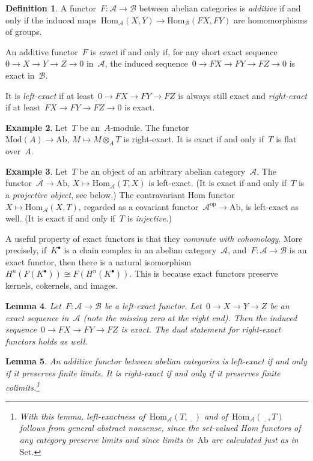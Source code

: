 \documentclass{amsart}
\theoremstyle{definition}
\newtheorem{defn}{Definition}[section]
\newtheorem{ex}[defn]{Example}
\theoremstyle{plain}
\newtheorem{lemma}[defn]{Lemma}
\theoremstyle{remark}
\newcommand{\A}{\mathcal{A}}
\newcommand{\B}{\mathcal{B}}
\newcommand{\Hom}{\mathrm{Hom}}
\newcommand{\placeholder}{\underline{\ \ \ }}
\newcommand{\Set}{\mathrm{Set}}
\newcommand{\Ab}{\mathrm{Ab}}
\newcommand{\Mod}{\mathrm{Mod}}
\newcommand{\op}{\mathrm{op}}
\newcommand{\?}{\,{:}\,}
\renewcommand{\_}{\mathpunct{.}\,}
\begin{document}
\begin{defn}A functor~$F : \A \to \B$ between abelian categories is
\emph{additive} if and only if the induced maps~$\Hom_\A(X,Y) \to
\Hom_\B(FX,FY)$ are homomorphisms of groups.

An additive functor~$F$ is
\emph{exact} if and only if, for any short exact sequence~$0 \to X \to Y \to Z
\to 0$ in~$\A$, the induced sequence~$0 \to FX \to FY \to FZ \to 0$ is exact
in~$\B$.

It is \emph{left-exact} if at least~$0 \to FX \to FY \to FZ$ is always still
exact and \emph{right-exact} if at least~$FX \to FY \to FZ \to 0$ is
exact.\end{defn}

\begin{ex}Let~$T$ be an~$A$-module. The functor~$\Mod(A) \to \Ab,\,M
\mapsto M \otimes_A T$ is right-exact. It is exact if and only if~$T$
is flat over~$A$.\end{ex}

\begin{ex}Let~$T$ be an object of an arbitrary abelian category~$\A$. The
functor~$\A \to \Ab,\,X \mapsto \Hom_\A(T,X)$ is left-exact. (It is exact if
and only if~$T$ is a \emph{projective object}, see below.) The contravariant
Hom functor~$X \mapsto \Hom_\A(X,T)$, regarded as a covariant functor~$\A^\op
\to \Ab$, is left-exact as well. (It is exact if and only if~$T$ is
\emph{injective.})\end{ex}

A useful property of exact functors is that they \emph{commute with
cohomology}. More precisely, if~$K^\bullet$ is a chain complex in an abelian
category~$\A$, and~$F : \A \to \B$ is an exact functor, then there is a natural
isomorphism~$H^n(F(K^\bullet)) \cong F(H^n(K^\bullet))$. This is because exact
functors preserve kernels, cokernels, and images.

\begin{lemma}Let~$F : \A \to \B$ be a left-exact functor. Let~$0 \to X \to Y
\to Z$ be an exact sequence in~$\A$ (note the missing zero at the right end).
Then the induced sequence~$0 \to FX \to FY \to FZ$ is exact. The
dual statement for right-exact functors holds as well.\end{lemma}

\begin{lemma}An additive functor between abelian categories is left-exact if
and only if it preserves finite limits. It is right-exact if and only if it
preserves finite colimits.\footnote{With this lemma, left-exactness
of~$\Hom_\A(T,\placeholder)$ and of~$\Hom_\A(\placeholder,T)$ follows from
general abstract nonsense, since the set-valued Hom functors of any category
preserve limits and since limits in~$\Ab$ are calculated just as in~$\Set$.}\end{lemma}
\end{document}
